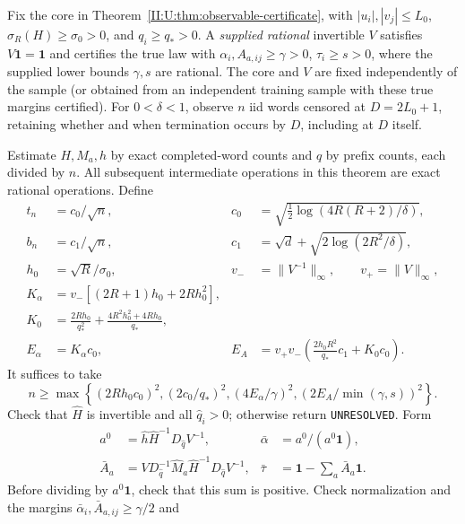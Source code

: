 \begin{theorem}
\label{II:U:thm:fixed-basis-sampling}
Fix the core in Theorem~\ref{II:U:thm:observable-certificate}, with
$|u_i|,|v_j|\le L_0$, $\sigma_R(H)\ge\sigma_0>0$, and
$q_i\ge q_*>0$. A \emph{supplied rational} invertible $V$ satisfies
$V\mathbf1=\mathbf1$ and certifies the true law with
$\alpha_i,A_{a,ij}\ge\gamma>0$, $\tau_i\ge s>0$, where the
supplied lower bounds $\gamma,s$ are rational.
The core and $V$ are fixed independently of the sample (or obtained
from an independent training sample with these true margins certified).
For $0<\delta<1$, observe $n$ iid words censored at $D=2L_0+1$, retaining whether and
when termination occurs by $D$, including at $D$ itself.

Estimate $H,M_a,h$ by exact completed-word counts and $q$ by prefix
counts, each divided by $n$. All subsequent intermediate operations
in this theorem are exact rational operations. Define
\begin{align*}
 t_n&=c_0/\sqrt n,&
 c_0&=\sqrt{\tfrac12\log(4R(R+2)/\delta)},\\
 b_n&=c_1/\sqrt n,&
 c_1&=\sqrt d+\sqrt{2\log(2R^2/\delta)},\\
 h_0&=\sqrt R/\sigma_0,&v_-&=\|V^{-1}\|_\infty,
 \qquad v_+=\|V\|_\infty,\\
 K_\alpha&=v_-[(2R+1)h_0+2Rh_0^2],\\
 K_0&=\frac{2Rh_0}{q_*^2}
          +\frac{4R^2h_0^2+4Rh_0}{q_*},\\
 E_\alpha&=K_\alpha c_0,&
 E_A&=v_+v_-\left(\frac{2h_0R^2}{q_*}c_1+K_0c_0\right).
\end{align*}
It suffices to take
\begin{equation}
 n\ge\max\left\{(2Rh_0c_0)^2,(2c_0/q_*)^2,
 (4E_\alpha/\gamma)^2,
 \left(2E_A/\min(\gamma,s)\right)^2\right\}.
 \label{II:U:eq:fixed-basis-n}
\end{equation}
Check that $\widehat H$ is invertible and all $\widehat q_i>0$;
otherwise return \texttt{UNRESOLVED}. Form
\begin{align*}
 a^0&=\widehat h\widehat H^{-1}D_{\widehat q}V^{-1},
 &\bar\alpha&=a^0/(a^0\mathbf1),\\
 \bar A_a&=V D_{\widehat q}^{-1}\widehat M_a
                  \widehat H^{-1}D_{\widehat q}V^{-1},
 &\bar\tau&=\mathbf1-\sum_a\bar A_a\mathbf1.
\end{align*}
Before dividing by $a^0\mathbf1$, check that this sum is positive.
Check normalization and the margins
$\bar\alpha_i,\bar A_{a,ij}\ge\gamma/2$ and

\end{theorem}
